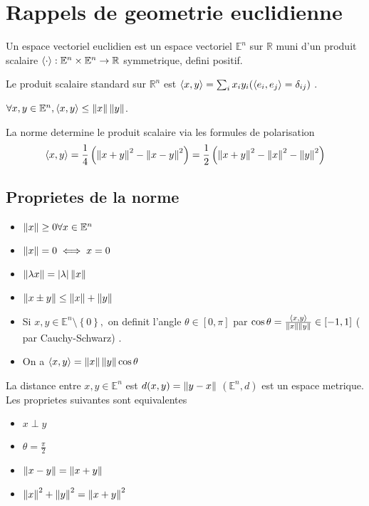 \documentclass[../main.tex]{subfiles}
\begin{document}
\section{Rappels de geometrie euclidienne}
\begin{defn}
	Un espace vectoriel euclidien est un espace vectoriel $ \mathbb{E}^{n}$ sur $\mathbb{R}$ muni d'un produit scalaire $\left\langle \cdot\right\rangle : \mathbb{E}^{n}\times \mathbb{E}^{n}\to \mathbb{R}$ symmetrique, defini positif.
\end{defn}
Le produit scalaire standard sur $\mathbb{R}^{n}$ est $\left\langle x,y\right\rangle = \sum_i x_i y_i ( \left\langle e_i,e_j\right\rangle = \delta_{ij} ) $ .
\begin{propo}  
$\forall x,y \in \mathbb{E}^{n}, \left\langle x,y\right\rangle  \leq \left\lVert x\right\rVert \left\lVert y\right\rVert$.
\end{propo}
\begin{rmq}
La norme determine le produit scalaire via les formules de polarisation
\[ 
	\left\langle x,y\right\rangle = \frac{1}{4} \left( \left\lVert x+y\right\rVert ^{2} - \left\lVert x-y\right\rVert ^{2} \right) = \frac{1}{2} \left( \left\lVert x+y\right\rVert ^{2}- \left\lVert x\right\rVert ^{2} - \left\lVert y\right\rVert ^{2}\right) 
\]

\end{rmq}
\subsection{Proprietes de la norme}
\begin{itemize}
\item $ \left\lVert x\right\rVert \geq 0 \forall x \in \mathbb{E}^{n}$ 
\item $\left\lVert x\right\rVert =0 \iff x=0$ 
\item $ \left\lVert \lambda x\right\rVert = |\lambda| \left\lVert x\right\rVert$ 
\item $\left\lVert x\pm y\right\rVert \leq \left\lVert x\right\rVert + \left\lVert y\right\rVert$ 
\end{itemize}
\begin{defn}
	\begin{itemize}
		\item Si $x,y \in \mathbb{E}^{n}\setminus \left\{ 0 \right\} , $ on definit l'angle $\theta \in [ 0,\pi] $ par $\cos \theta = \frac{\left\langle x,y\right\rangle }{\left\lVert x\right\rVert \left\lVert y\right\rVert}\in [ -1,1] $ ( par Cauchy-Schwarz) .
		\item On a $\left\langle x,y\right\rangle = \left\lVert x\right\rVert \left\lVert y\right\rVert \cos \theta$ 
	\end{itemize}
	
\end{defn}
La distance entre $x,y \in \mathbb{E}^{n}$ est $d( x,y) = \left\lVert y-x\right\rVert $
$ ( \mathbb{E}^{n},d) $ est un espace metrique.
Les proprietes suivantes sont equivalentes
\begin{itemize}
\item $x\perp y$ 
\item $\theta = \frac{\pi}{2}$ 
\item $\left\lVert x-y\right\rVert = \left\lVert x+y\right\rVert $ 
\item $\left\lVert x\right\rVert ^{2} + \left\lVert y\right\rVert ^{2} = \left\lVert x+y\right\rVert ^{2} $ 
\end{itemize}
\end{document}
